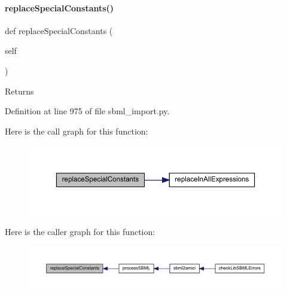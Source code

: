 \paragraph{\texorpdfstring{replace\+Special\+Constants()}{replaceSpecialConstants()}}
{\footnotesize\ttfamily def replace\+Special\+Constants (\begin{DoxyParamCaption}\item[{}]{self }\end{DoxyParamCaption})}

\begin{DoxyReturn}{Returns}

\end{DoxyReturn}


Definition at line 975 of file sbml\+\_\+import.\+py.

Here is the call graph for this function\+:
\nopagebreak
\begin{figure}[H]
\begin{center}
\leavevmode
\includegraphics[width=350pt]{classamici_1_1sbml__import_1_1_sbml_importer_a5348e7b5041334f8c54b45c5c928dea0_cgraph}
\end{center}
\end{figure}
Here is the caller graph for this function\+:
\nopagebreak
\begin{figure}[H]
\begin{center}
\leavevmode
\includegraphics[width=350pt]{classamici_1_1sbml__import_1_1_sbml_importer_a5348e7b5041334f8c54b45c5c928dea0_icgraph}
\end{center}
\end{figure}
